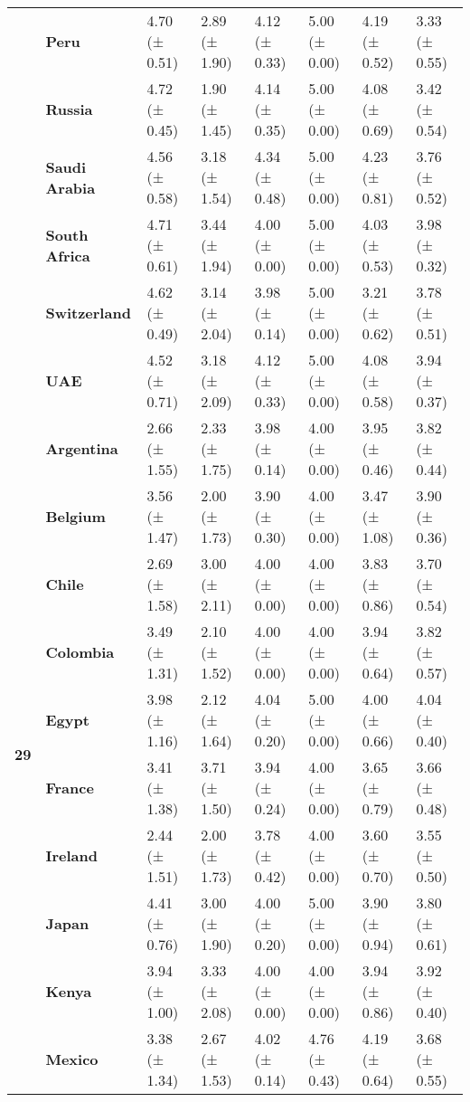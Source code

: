\begin{tabular}{llllllll}
\textbf{} & \textbf{Peru} & 4.70 (± 0.51) & 2.89 (± 1.90) & 4.12 (± 0.33) & 5.00 (± 0.00) & 4.19 (± 0.52) & 3.33 (± 0.55) \\
\textbf{} & \textbf{Russia} & 4.72 (± 0.45) & 1.90 (± 1.45) & 4.14 (± 0.35) & 5.00 (± 0.00) & 4.08 (± 0.69) & 3.42 (± 0.54) \\
\textbf{} & \textbf{Saudi Arabia} & 4.56 (± 0.58) & 3.18 (± 1.54) & 4.34 (± 0.48) & 5.00 (± 0.00) & 4.23 (± 0.81) & 3.76 (± 0.52) \\
\textbf{} & \textbf{South Africa} & 4.71 (± 0.61) & 3.44 (± 1.94) & 4.00 (± 0.00) & 5.00 (± 0.00) & 4.03 (± 0.53) & 3.98 (± 0.32) \\
\textbf{} & \textbf{Switzerland} & 4.62 (± 0.49) & 3.14 (± 2.04) & 3.98 (± 0.14) & 5.00 (± 0.00) & 3.21 (± 0.62) & 3.78 (± 0.51) \\
\textbf{} & \textbf{UAE} & 4.52 (± 0.71) & 3.18 (± 2.09) & 4.12 (± 0.33) & 5.00 (± 0.00) & 4.08 (± 0.58) & 3.94 (± 0.37) \\
\cline{1-8}
\multirow[t]{19}{*}{\textbf{29}} & \textbf{Argentina} & 2.66 (± 1.55) & 2.33 (± 1.75) & 3.98 (± 0.14) & 4.00 (± 0.00) & 3.95 (± 0.46) & 3.82 (± 0.44) \\
\textbf{} & \textbf{Belgium} & 3.56 (± 1.47) & 2.00 (± 1.73) & 3.90 (± 0.30) & 4.00 (± 0.00) & 3.47 (± 1.08) & 3.90 (± 0.36) \\
\textbf{} & \textbf{Chile} & 2.69 (± 1.58) & 3.00 (± 2.11) & 4.00 (± 0.00) & 4.00 (± 0.00) & 3.83 (± 0.86) & 3.70 (± 0.54) \\
\textbf{} & \textbf{Colombia} & 3.49 (± 1.31) & 2.10 (± 1.52) & 4.00 (± 0.00) & 4.00 (± 0.00) & 3.94 (± 0.64) & 3.82 (± 0.57) \\
\textbf{} & \textbf{Egypt} & 3.98 (± 1.16) & 2.12 (± 1.64) & 4.04 (± 0.20) & 5.00 (± 0.00) & 4.00 (± 0.66) & 4.04 (± 0.40) \\
\textbf{} & \textbf{France} & 3.41 (± 1.38) & 3.71 (± 1.50) & 3.94 (± 0.24) & 4.00 (± 0.00) & 3.65 (± 0.79) & 3.66 (± 0.48) \\
\textbf{} & \textbf{Ireland} & 2.44 (± 1.51) & 2.00 (± 1.73) & 3.78 (± 0.42) & 4.00 (± 0.00) & 3.60 (± 0.70) & 3.55 (± 0.50) \\
\textbf{} & \textbf{Japan} & 4.41 (± 0.76) & 3.00 (± 1.90) & 4.00 (± 0.20) & 5.00 (± 0.00) & 3.90 (± 0.94) & 3.80 (± 0.61) \\
\textbf{} & \textbf{Kenya} & 3.94 (± 1.00) & 3.33 (± 2.08) & 4.00 (± 0.00) & 4.00 (± 0.00) & 3.94 (± 0.86) & 3.92 (± 0.40) \\
\textbf{} & \textbf{Mexico} & 3.38 (± 1.34) & 2.67 (± 1.53) & 4.02 (± 0.14) & 4.76 (± 0.43) & 4.19 (± 0.64) & 3.68 (± 0.55) \\

\end{tabular}
